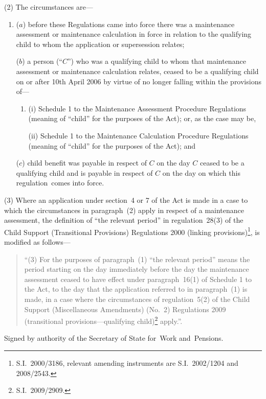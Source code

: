 \documentclass[12pt,a4paper]{article}
\begin{document}
(2) The circumstances are—
\begin{enumerate}\item[]
($a$) before these Regulations came into force there was a maintenance assessment or maintenance calculation in force in relation to the qualifying child to whom the application or supersession relates;

($b$) a person (“$C$”) who was a qualifying child to whom that maintenance assessment or maintenance calculation relates, ceased to be a qualifying child on or after 10th April 2006 by virtue of no longer falling within the provisions of—
\begin{enumerate}\item[]
(i) Schedule 1 to the Maintenance Assessment Procedure Regulations (meaning of “child” for the purposes of the Act); or, as the case may be,

(ii) Schedule 1 to the Maintenance Calculation Procedure Regulations (meaning of “child” for the purposes of the Act); and
\end{enumerate}

($c$) child benefit was payable in respect of $C$ on the day $C$ ceased to be a qualifying child and is payable in respect of $C$ on the day on which this regulation~comes into force.
\end{enumerate}

(3) Where an application under section~4 or 7 of the Act is made in a case to which the circumstances in paragraph~(2) apply in respect of a maintenance assessment, the definition of “the relevant period” in regulation~28(3) of the Child Support (Transitional Provisions) Regulations 2000 (linking provisions)\footnote{S.I.~2000/3186, relevant amending instruments are S.I.~2002/1204 and 2008/2543.}, is modified as follows—
\begin{quotation}
“(3) For the purposes of paragraph~(1) “the relevant period” means the period starting on the day immediately before the day the maintenance assessment ceased to have effect under paragraph~16(1) of Schedule 1 to the Act, to the day that the application referred to in paragraph~(1) is made, in a case where the circumstances of regulation~5(2) of the Child Support (Miscellaneous Amendments) (No.~2) Regulations 2009 (transitional provisions---qualifying child)\footnote{S.I.~2009/2909.} apply.”.
\end{quotation}

\bigskip

\pagebreak[3]

Signed 
by authority of the 
Secretary of State for~Work and~Pensions.
\end{document}
